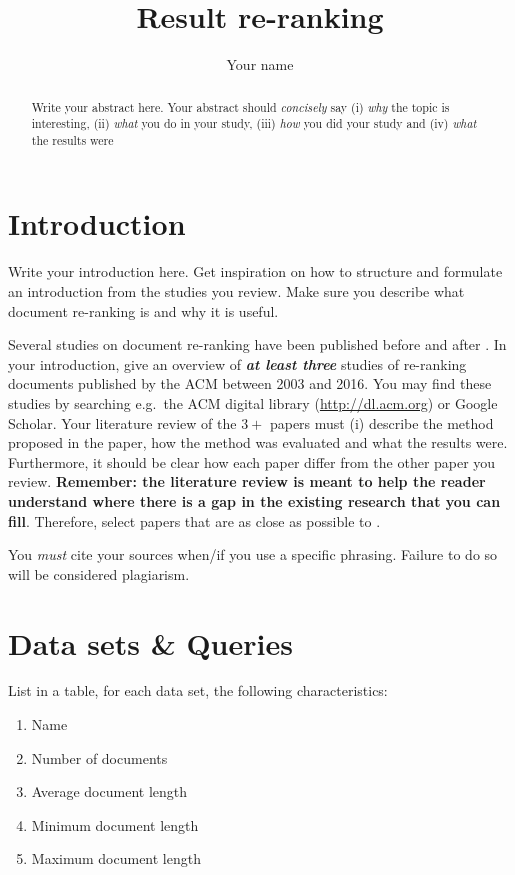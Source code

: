 \documentclass{sig-alternate}
\begin{document}
\title{Result re-ranking}
\author{
\alignauthor 
Your name
}
\maketitle

\begin{abstract}
Write your abstract here. Your abstract should \emph{concisely} say (i) \emph{why} the topic is interesting, (ii) \emph{what} you do in your study, (iii) \emph{how} you did your study and (iv) \emph{what} the results were
\end{abstract}

\section{Introduction}
Write your introduction here. Get inspiration on how to structure and formulate an introduction from the studies you review. Make sure you describe what document re-ranking is and why it is useful.

Several studies on document re-ranking have been published before and after \cite{woo2010achieving}. In your introduction, give an overview of \textbf{\emph{at least three}} studies of re-ranking documents published by the ACM between 2003 and 2016. You may find these studies by searching e.g.\ the ACM digital library (\url{http://dl.acm.org}) or Google Scholar. Your literature review of the $3+$ papers must (i) describe the method proposed in the paper, how the method was evaluated and what the results were. Furthermore, it should be clear how each paper differ from the other paper you review. \textbf{Remember: the literature review is meant to help the reader understand where there is a gap in the existing research that you can fill}. Therefore, select papers that are as close as possible to \cite{woo2010achieving}.

You \emph{must} cite your sources when/if you use a specific phrasing. Failure to do so will be considered plagiarism.

\section{Data sets \& Queries}
List in a table, for each data set, the following characteristics:
\begin{enumerate}
\item Name
\item Number of documents
\item Average document length
\item Minimum document length
\item Maximum document length
\end{enumerate}
\end{document}
